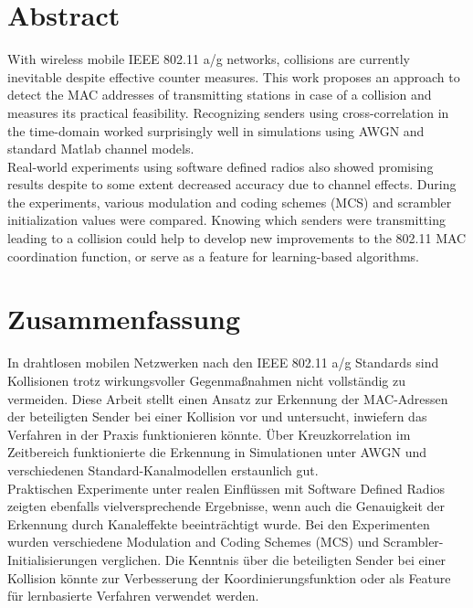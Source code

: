 

\begingroup
\let\clearpage\relax
\let\cleardoublepage\relax
\let\cleardoublepage\relax

\chapter*{Abstract}

With wireless mobile IEEE 802.11 a/g networks, collisions are currently inevitable despite effective counter measures. This work proposes an approach to detect the MAC addresses of transmitting stations in case of a collision and measures its practical feasibility. Recognizing senders using cross-correlation in the time-domain worked surprisingly well in simulations using AWGN and standard Matlab channel models.\\

Real-world experiments using software defined radios also showed promising results despite to some extent decreased accuracy due to channel effects. During the experiments, various modulation and coding schemes (MCS) and scrambler initialization values were compared. Knowing which senders were transmitting leading to a collision could help to develop new improvements to the 802.11 MAC coordination function, or serve as a feature for learning-based algorithms.



\vfill
{}
\chapter*{Zusammenfassung}

In drahtlosen mobilen Netzwerken nach den IEEE 802.11 a/g Standards sind Kollisionen trotz wirkungsvoller Gegenmaßnahmen nicht vollständig zu vermeiden. Diese Arbeit stellt einen Ansatz zur Erkennung der MAC-Adressen der beteiligten Sender bei einer Kollision vor und untersucht, inwiefern das Verfahren in der Praxis funktionieren könnte. Über Kreuzkorrelation im Zeitbereich funktionierte die Erkennung in Simulationen unter AWGN und verschiedenen Standard-Kanalmodellen erstaunlich gut.\\

Praktischen Experimente unter realen Einflüssen mit Software Defined Radios zeigten ebenfalls vielversprechende Ergebnisse, wenn auch die Genauigkeit der Erkennung durch Kanaleffekte beeinträchtigt wurde. Bei den Experimenten wurden verschiedene Modulation and Coding Schemes (MCS) und Scrambler-Initialisierungen verglichen. Die Kenntnis über die beteiligten Sender bei einer Kollision könnte zur Verbesserung der Koordinierungsfunktion oder als Feature für lernbasierte Verfahren verwendet werden.


\endgroup
\vfill
